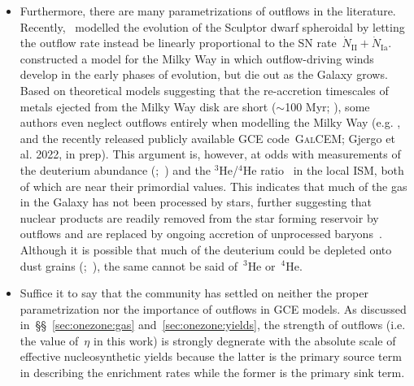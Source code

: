 \documentclass[ms.tex]{subfiles}
\begin{document}
\begin{itemize}
	\item Furthermore, there are many parametrizations of outflows in the
	literature. Recently,~\citet{delosReyes2022} modelled the evolution of the
	Sculptor dwarf spheroidal by letting the outflow rate instead be linearly
	proportional to the SN rate~$\dot{N}_\text{II} + \dot{N}_\text{Ia}$.
	\citet*{Kobayashi2020} constructed a model for the Milky Way in which
	outflow-driving winds develop in the early phases of evolution, but die
	out as the Galaxy grows.
	Based on theoretical models suggesting that the re-accretion timescales
	of metals ejected from the Milky Way disk are short ($\sim$100 Myr;
	\citealp{Melioli2008, Melioli2009, Spitoni2008, Spitoni2009}), some
	authors even neglect outflows entirely when modelling the Milky Way (e.g.
	\citealp{Spitoni2019, Spitoni2021}, and the recently released publicly
	available GCE code~\textsc{GalCEM}; Gjergo et al. 2022, in prep).
	This argument is, however, at odds with measurements of the deuterium
	abundance (\citealp{Linsky2006};~\citealp*{Prodanovic2010}) and the
	$^3$He/$^4$He ratio~\citep{Balser2018} in the local ISM, both of which
	are near their primordial values.
	This indicates that much of the gas in the Galaxy has not been
	processed by stars, further suggesting that nuclear products are
	readily removed from the star forming reservoir by outflows and are
	replaced by ongoing accretion of unprocessed
	baryons~\citep{Weinberg2017b, Cooke2022}.
	Although it is possible that much of the deuterium could be depleted
	onto dust grains (\citealp{Romano2006};~\citealp*{Steigman2007}), the
	same cannot be said of~$^3$He or~$^4$He.

	\item Suffice it to say that the community has settled on neither the
	proper parametrization nor the importance of outflows in GCE models.
	As discussed in~\S\S~\ref{sec:onezone:gas} and~\ref{sec:onezone:yields},
	the strength of outflows (i.e. the value of~$\eta$ in this work) is
	strongly degnerate with the absolute scale of effective nucleosynthetic
	yields because the latter is the primary source term in describing the
	enrichment rates while the former is the primary sink term.


\end{itemize}
\end{document}
